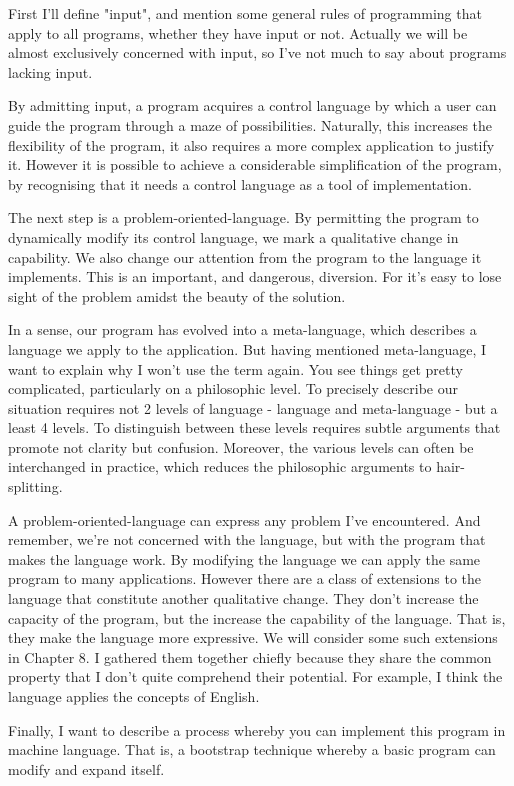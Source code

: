 \documentclass[b5paper, oneside]{book}
\begin{document}
First I'll define "input", and mention some general rules of programming that apply to all programs, whether they have input or not. Actually we will be almost exclusively concerned with input, so I've not much to say about programs lacking input.

By admitting input, a program acquires a control language by which a user can guide the program through a maze of possibilities. Naturally, this increases the flexibility of the program, it also requires a more complex application to justify it. However it is possible to achieve a considerable simplification of the program, by recognising that it needs a control language as a tool of implementation.

The next step is a problem-oriented-language. By permitting the program to dynamically modify its control language, we mark a qualitative change in capability. We also change our attention from the program to the language it implements. This is an important, and dangerous, diversion. For it's easy to lose sight of the problem amidst the beauty of the solution.

In a sense, our program has evolved into a meta-language, which describes a language we apply to the application. But having mentioned meta-language, I want to explain why I won't use the term again. You see things get pretty complicated, particularly on a philosophic level. To precisely describe our situation requires not 2 levels of language - language and meta-language - but a least 4 levels. To distinguish between these levels requires subtle arguments that promote not clarity but confusion. Moreover, the various levels can often be interchanged in practice, which reduces the philosophic arguments to hair-splitting.

A problem-oriented-language can express any problem I've encountered. And remember, we're not concerned with the language, but with the program that makes the language work. By modifying the language we can apply the same program to many applications. However there are a class of extensions to the language that constitute another qualitative change. They don't increase the capacity of the program, but the increase the capability of the language. That is, they make the language more expressive. We will consider some such extensions in Chapter 8. I gathered them together chiefly because they share the common property that I don't quite comprehend their potential. For example, I think the language applies the concepts of English.

Finally, I want to describe a process whereby you can implement this program in machine language. That is, a bootstrap technique whereby a basic program can modify and expand itself.
\end{document}
